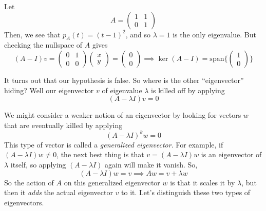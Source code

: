	\begin{example}
	  \label{ex:multiplicity-2-eigenvalue-but-1-eigenvector}
	  Let 
		\begin{equation}
			A = \begin{pmatrix} 1 & 1 \\ 0 & 1 \end{pmatrix}
		\end{equation}
		Then, we see that $p_A (t) = (t - 1)^2$, and so $\lambda = 1$ is the only eigenvalue. But checking the nullspace of $A$ gives 
		\begin{equation}
			(A - I) v = \begin{pmatrix} 0 & 1 \\ 0 & 0 \end{pmatrix} \begin{pmatrix} x \\ y \end{pmatrix} = \begin{pmatrix} 0 \\ 0 \end{pmatrix} \implies \ker(A - I) = \mathrm{span} \bigg\{ \begin{pmatrix} 1 \\ 0 \end{pmatrix} \bigg\} 
		\end{equation}
	\end{example}

	It turns out that our hypothesis is false. So where is the other ``eigenvector'' hiding? Well our eigenvector $v$ of eigenvalue $\lambda$ is killed off by applying 
	\begin{equation}
		(A - \lambda I) v = 0
	\end{equation}

	We might consider a weaker notion of an eigenvector by looking for vectors $w$ that are eventually killed by applying 
	\begin{equation}
	  (A - \lambda I)^k w = 0
	\end{equation}
	This type of vector is called a \textit{generalized eigenvector}. For example, if $(A - \lambda I) w \neq 0$, the next best thing is that $v = (A - \lambda I) w$ is an eigenvector of $\lambda$ itself, so applying $(A - \lambda I)$ again will make it vanish. So, 
	\begin{equation}
		(A - \lambda I) w = v \implies Aw = v + \lambda w
	\end{equation}
	So the action of $A$ on this generalized eigenvector $w$ is that it scales it by $\lambda$, but then it \textit{adds} the actual eigenvector $v$ to it. Let's distinguish these two types of eigenvectors. 

